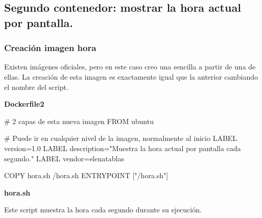 

\subsection{Segundo contenedor: mostrar la hora actual por pantalla.}


\subsubsection{Creación imagen hora}
\par Existen imágenes oficiales, pero en este caso creo una sencilla a partir de una de ellas.
La creación de esta imagen es exactamente igual que la anterior cambiando el nombre del script.
\par \textbf{Dockerfile2}
\begin{listing}
    # 2 capas de esta nueva imagen
    FROM ubuntu
    
    # Puede ir en cualquier nivel de la imagen, normalmente al inicio
    LABEL version=1.0
    LABEL description="Muestra la hora actual por pantalla cada segundo." 
    LABEL vendor=elenatablas
    
    COPY hora.sh /hora.sh
    ENTRYPOINT ["/hora.sh"] 
\end{listing}

\par \textbf{hora.sh}
\par Este script muestra la hora cada segundo durante su ejecución.
